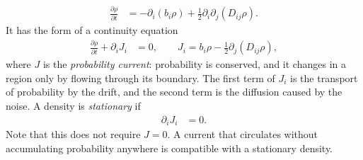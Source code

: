 \documentclass[11pt]{article}
\begin{document}
\begin{align}
  \frac{\partial\rho}{\partial t}&=-\partial_i(b_i\rho)+\frac{1}{2}\partial_i\partial_j(D_{ij}\rho).
  \label{fp}
\end{align}
It has the form of a continuity equation
\begin{align}
  \frac{\partial\rho}{\partial t}+\partial_iJ_i&=0,\qquad J_i=b_i\rho-\frac{1}{2}\partial_j(D_{ij}\rho),
  \label{current}
\end{align}
where $J$ is the {\it probability current}: probability is conserved, and it changes in a region only by flowing through its boundary. The first term of $J_i$ is the transport of probability by the drift, and the second term is the diffusion caused by the noise. A density is {\it stationary} if
\begin{align}
  \partial_iJ_i&=0.
\end{align}
Note that this does not require $J=0$. A current that circulates without accumulating probability anywhere is compatible with a stationary density.
\end{document}

